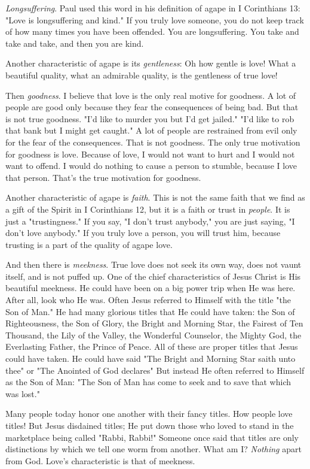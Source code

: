 \emph{Longsuffering}. Paul used this word in his definition of agape in I Corinthians 13: "Love is longsuffering and kind." If you truly love someone, you do not keep track of how many times you have been offended. You are longsuffering. You take and take and take, and then you are kind. 

Another characteristic of agape is its \emph{gentleness}: Oh how gentle is love! What a beautiful quality, what an admirable quality, is the gentleness of true love! 

Then \emph{goodness}. I believe that love is the only real motive for goodness. A lot of people are good only because they fear the consequences of being bad. But that is not true goodness. "I'd like to murder you but I'd get jailed." "I'd like to rob that bank but I might get caught." A lot of people are restrained from evil only for the fear of the consequences. That is not goodness. The only true motivation for goodness is love. Because of love, I would not want to hurt and I would not want to offend. I would do nothing to cause a person to stumble, because I love that person. That's the true motivation for goodness. 

Another characteristic of agape is \emph{faith}. This is not the same faith that we find as a gift of the Spirit in I Corinthians 12, but it is a faith or trust in \emph{people}. It is just a "trustingness." If you say, "I don't trust anybody," you are just saying, "I don't love anybody." If you truly love a person, you will trust him, because trusting is a part of the quality of agape love. 

And then there is \emph{meekness}. True love does not seek its own way, does not vaunt itself, and is not puffed up. One of the chief characteristics of Jesus Christ is His beautiful meekness. He could have been on a big power trip when He was here. After all, look who He was. Often Jesus referred to Himself with the title "the Son of Man." He had many glorious titles that He could have taken: the Son of Righteousness, the Son of Glory, the Bright and Morning Star, the Fairest of Ten Thousand, the Lily of the Valley, the Wonderful Counselor, the Mighty God, the Everlasting Father, the Prince of Peace. All of these are proper titles that Jesus could have taken. He could have said "The Bright and Morning Star saith unto thee" or "The Anointed of God declares" But instead He often referred to Himself as the Son of Man: "The Son of Man has come to seek and to save that which was lost." 

Many people today honor one another with their fancy titles. How people love titles! But Jesus disdained titles; He put down those who loved to stand in the marketplace being called "Rabbi, Rabbi!" Someone once said that titles are only distinctions by which we tell one worm from another. What am I? \emph{Nothing} apart from God. Love's characteristic is that of meekness. 

